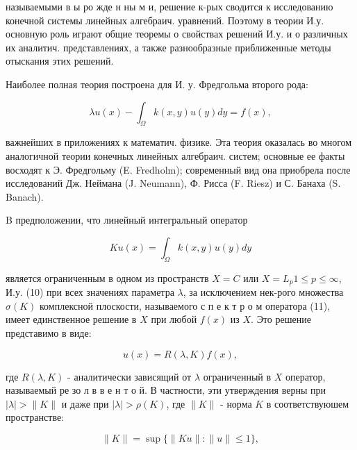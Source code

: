 \documentclass[10pt]{article}
\begin{document}
называемыми в ы ро жде н ны м и, решение к-рых сводится к исследованию конечной системы линейных алгебраич. уравнений. Поэтому в теории И.у. основную роль играют общие теоремы о свойствах решений И.у. и о различных их аналитич. представлениях, а также разнообразные приближенные методы отыскания этих решений.



Наиболее полная теория построена для И. у. Фредгольма второго рода:



\[

\lambda u(x)-\int_{\Omega} k(x, y) u(y) d y=f(x),

\]



важнейших в приложениях к математич. физике. Эта теория оказалась во многом аналогичной теории конечных линейных алгебраич. систем; основные ее факты восходят к Э. Фредгольму (E. Fredholm); современный вид она приобрела после исследований Дж. Неймана (J. Neumann), Ф. Рисса (F. Riesz) и С. Банаха (S. Banach).



B предположении, что линейный интегральный оператор



\[

K u(x)=\int_{\Omega} k(x, y) u(y) d y

\]



является ограниченным в одном из пространств $X=C$ или $X=L_{p} 1 \leqslant p \leqslant \infty$, И.у. (10) при всех значениях параметра $\lambda$, за исключением нек-рого множества $\sigma(K)$ комплексной плоскости, называемого с п е к т р о м оператора (11), имеет единственное решение в $X$ при любой $f(x)$ из $X$. Это решение представимо в виде:



\[

u(x)=R(\lambda, K) f(x),

\]



где $R(\lambda, K)$ - аналитически зависящий от $\lambda$ ограниченный в $X$ оператор, называемый ре зо л в в е н т о й. В частности, эти утверждения верны при $|\lambda|>\|K\|$ и даже при $|\lambda|>\rho(K)$, где $\|K\|$ - норма $K$ в соответствуюшем пространстве:



\[

\|K\|=\sup \{\|K u\|:\|u\| \leqslant 1\},

\]
\end{document}

